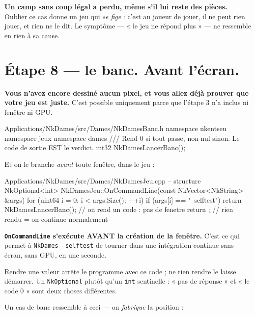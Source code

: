 \begin{nkpiege}
\textbf{Un camp sans coup légal a perdu, même s'il lui reste des pièces.} Oublier
ce cas donne un jeu qui \emph{se fige} : c'est au joueur de jouer, il ne peut
rien jouer, et rien ne le dit. Le symptôme --- « le jeu ne répond plus » --- ne
ressemble en rien à sa cause.
\end{nkpiege}

\section{Étape 8 --- le banc. Avant l'écran.}

\textbf{Vous n'avez encore dessiné aucun pixel, et vous allez déjà prouver que
votre jeu est juste.} C'est possible uniquement parce que l'étape 3 n'a inclus
ni fenêtre ni GPU.

\begin{nkcode}{Applications/NkDames/src/Dames/NkDamesBanc.h}
namespace nkentseu { namespace jeux { namespace dames {
    /// Rend 0 si tout passe, non nul sinon. Le code de sortie EST le verdict.
    int32 NkDamesLancerBanc();
}}}
\end{nkcode}

Et on le branche \emph{avant} toute fenêtre, dans le jeu :

\begin{nkcode}{Applications/NkDames/src/Dames/NkDamesJeu.cpp -- structure}
NkOptional<int> NkDamesJeu::OnCommandLine(const NkVector<NkString> &args) {
    for (uint64 i = 0; i < args.Size(); ++i) {
        if (args[i] == "--selftest") {
            return NkDamesLancerBanc();     // on rend un code : pas de fenetre
        }
    }
    return {};                              // rien rendu = on continue normalement
}
\end{nkcode}

\begin{nkretenir}
\textbf{\texttt{OnCommandLine} s'exécute AVANT la création de la fenêtre.} C'est
ce qui permet à \texttt{NkDames --selftest} de tourner dans une intégration
continue sans écran, sans GPU, en une seconde.

Rendre une valeur arrête le programme avec ce code ; ne rien rendre le laisse
démarrer. Un \texttt{NkOptional} plutôt qu'un \texttt{int} sentinelle : « pas de
réponse » et « le code 0 » sont deux choses différentes.
\end{nkretenir}

Un cas de banc ressemble à ceci --- on \emph{fabrique} la position :

